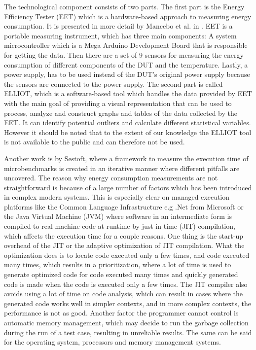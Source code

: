 The technological component consists of two parts. The first part is the Energy Efficiency Tester (EET) which is a hardware-based approach to measuring energy consumption. It is presented in more detail by Mancebo et al. in \cite*{GarciaEET}. EET is a portable measuring instrument, which has three main components: A system microcontroller which is a Mega Arduino Development Board that is responsible for getting the data. Then there are a set of 9 sensors for measuring the energy consumption of different components of the DUT and the temperature. Lastly, a power supply, has to be used instead of the DUT's original power supply because the sensors are connected to the power supply.\cite*{GarciaEET} The second part is called ELLIOT, which is a software-based tool which handles the data provided by EET with the main goal of providing a visual representation that can be used to process, analyze and construct graphs and tables of the data collected by the EET. It can identify potential outliers and calculate different statistical variables.\cite{GarciaFEETINGS} However it should be noted that to the extent of our knowledge the ELLIOT tool is not available to the public and can therefore not be used.\newline

 Another work is by Sestoft\cite[]{sestoft2013microbenchmarks}, where a framework to measure the execution time of microbenchmarks is created in an iterative manner where different pitfalls are uncovered. The reason why energy consumption measurements are not straightforward is because of a large number of factors which has been introduced in complex modern systems. This is especially clear on managed execution platforms like the Common Language Infrastructure e.g .Net from Microsoft or the Java Virtual Machine (JVM) where software in an intermediate form is compiled to real machine code at runtime by just-in-time (JIT) compilation, which affects the execution time for a couple  reasons. One thing is the start-up overhead of the JIT or the adaptive optimization of JIT compilation. What the optimization does is to locate code executed only a few times, and code executed many times, which results in a prioritization, where a lot of time is used to generate optimized code for code executed many times and quickly generated code is made when the code is executed only a few times. The JIT compiler also avoids using a lot of time on code analysis, which can result in cases where the generated code works well in simpler contexts, and in more complex contexts, the performance is not as good. Another factor the programmer cannot control is automatic memory management, which may decide to run the garbage collection during the run of a test case, resulting in unreliable results. The same can be said for the operating system, processors and memory management systems.

